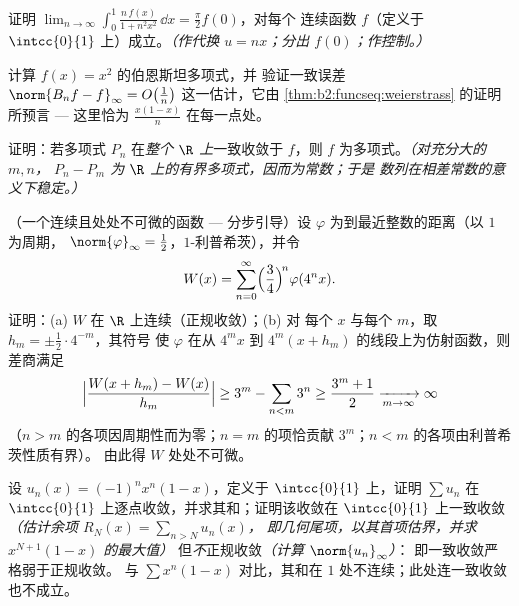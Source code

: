 \begin{exercise}[$\star\star$]\label{exo:b2:funcseq:6}
证明 $\displaystyle\lim_{n\to\infty} \int_0^1
\frac{n\,f(x)}{1 + n^2x^2}\,\dd x = \frac{\pi}{2} f(0)$，对每个
连续函数 $f$（定义于 $\intcc{0}{1}$ 上）成立。\emph{（作代换 $u = nx$；分出
$f(0)$；作控制。）}
\end{exercise}

\begin{exercise}[$\star\star$]\label{exo:b2:funcseq:7}
计算 $f(x) = x^2$ 的伯恩斯坦多项式，并
验证一致误差 $\norm{B_n f - f}_\infty =
O\bigl(\frac1n\bigr)$ 这一估计，它由
\cref{thm:b2:funcseq:weierstrass} 的证明所预言 --- 这里恰为 $\frac{x(1 -
x)}{n}$ 在每一点处。
\end{exercise}

\begin{exercise}[$\star\star$]\label{exo:b2:funcseq:8}
证明：若多项式 $P_n$ 在\emph{整个
$\R$ 上}一致收敛于 $f$，则 $f$ 为多项式。\emph{（对充分大的 $m, n$，
$P_n - P_m$ 为 $\R$ 上的有界多项式，因而为常数；于是
数列在相差常数的意义下稳定。）}
\end{exercise}

\begin{exercise}[$\star\star\star$]\label{exo:b2:funcseq:9}
（一个连续且处处不可微的函数 --- 分步引导）设
$\varphi$ 为到最近整数的距离（以 $1$ 为周期，
$\norm{\varphi}_\infty = \frac12$，$1$-利普希茨），并令
\[
W(x) = \sum_{n=0}^{\infty} \Bigl(\frac{3}{4}\Bigr)^{\!n}
\varphi(4^n x) .
\]
证明：(a) $W$ 在 $\R$ 上连续（正规收敛）；(b) 对
每个 $x$ 与每个 $m$，取 $h_m = \pm\frac12\cdot 4^{-m}$，其符号
使 $\varphi$ 在从 $4^m x$
到 $4^m(x + h_m)$ 的线段上为仿射函数，则差商满足
\[
\Bigl|\frac{W(x + h_m) - W(x)}{h_m}\Bigr| \geq 3^m -
\sum_{n<m} 3^n \geq \frac{3^m + 1}{2} \xrightarrow[m\to\infty]{}
\infty
\]
（$n > m$ 的各项因周期性而为零；$n = m$ 的项恰贡献
$3^m$；$n < m$ 的各项由利普希茨性质有界）。
由此得 $W$ 处处不可微。
\end{exercise}

\begin{exercise}[$\star$]\label{exo:b2:funcseq:10}
设 $u_n(x) = (-1)^n x^n(1 - x)$，定义于 $\intcc{0}{1}$ 上，证明
$\sum u_n$ 在 $\intcc{0}{1}$ 上逐点收敛，并求其和；证明该收敛在
$\intcc{0}{1}$ 上一致收敛
\emph{（估计余项 $R_N(x) = \sum_{n > N} u_n(x)$，
即几何尾项，以其首项估界，并求 $x^{N+1}(1-x)$ 的最大值）}
但\emph{不}正规收敛\emph{（计算 $\norm{u_n}_\infty$）}：
即一致收敛严格弱于正规收敛。
与 $\sum x^n(1-x)$ 对比，其和在
$1$ 处不连续；此处连一致收敛也不成立。
\end{exercise}

